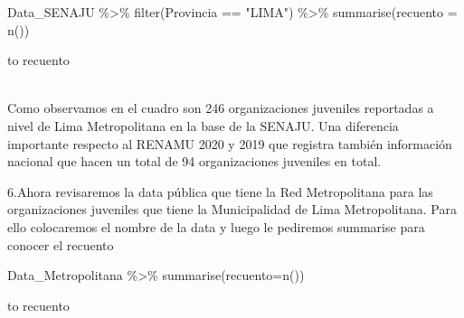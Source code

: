 \documentclass[
]{book}
\newenvironment{Shaded}{\begin{snugshade}}{\end{snugshade}}
\newcommand{\AttributeTok}[1]{\textcolor[rgb]{0.77,0.63,0.00}{#1}}
\newcommand{\FunctionTok}[1]{\textcolor[rgb]{0.00,0.00,0.00}{#1}}
\newcommand{\NormalTok}[1]{#1}
\newcommand{\SpecialCharTok}[1]{\textcolor[rgb]{0.00,0.00,0.00}{#1}}
\newcommand{\StringTok}[1]{\textcolor[rgb]{0.31,0.60,0.02}{#1}}
\begin{document}
\begin{Shaded}
\begin{Highlighting}[]
\NormalTok{Data\_SENAJU }\SpecialCharTok{\%\textgreater{}\%}
  \FunctionTok{filter}\NormalTok{(Provincia }\SpecialCharTok{==} \StringTok{"LIMA"}\NormalTok{) }\SpecialCharTok{\%\textgreater{}\%}
  \FunctionTok{summarise}\NormalTok{(}\AttributeTok{recuento =} \FunctionTok{n}\NormalTok{())}
\end{Highlighting}
\end{Shaded}

\begin{table}

\caption{\label{tab:unnamed-chunk-91}}
\centering
\begin{tabu}[c] to 
\hline
recuento\\
\\
\hline
\end{tabu}
\end{table}

Como observamos en el cuadro son 246 organizaciones juveniles reportadas a nivel de Lima Metropolitana en la base de la SENAJU. Una diferencia importante respecto al RENAMU 2020 y 2019 que registra también información nacional que hacen un total de 94 organizaciones juveniles en total.

6.Ahora revisaremos la data pública que tiene la Red Metropolitana para las organizaciones juveniles que tiene la Municipalidad de Lima Metropolitana. Para ello colocaremos el nombre de la data y luego le pediremos summarise para conocer el recuento

\begin{Shaded}
\begin{Highlighting}[]
\NormalTok{Data\_Metropolitana }\SpecialCharTok{\%\textgreater{}\%} 
 \FunctionTok{summarise}\NormalTok{(}\AttributeTok{recuento=}\FunctionTok{n}\NormalTok{()) }
\end{Highlighting}
\end{Shaded}

\begin{table}

\caption{\label{tab:unnamed-chunk-92}}
\centering
\begin{tabu}[c] to 
\hline
recuento\\
\\
\hline
\end{tabu}
\end{table}
\end{document}
